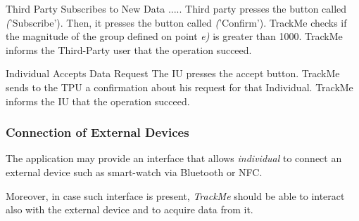 \documentclass[a4paper]{article}
\begin{document}
        \begin{usecase}{Third Party Subscribes to New Data}
              {.....}
              {Third party presses the button called \textit('Subscribe'). Then, it presses the button called \textit('Confirm').}
              {TrackMe checks if the magnitude of the group defined on point \textit{e)} is greater than 1000.}
              {TrackMe informs the Third-Party user that the operation succeed.}
        \end{usecase}
        
        \begin{usecase}{Individual Accepts Data Request}
              {The IU presses the accept button.}
              {TrackMe sends to the TPU a confirmation about his request for that Individual.}
              {TrackMe informs the IU that the operation succeed.}
        \end{usecase}
        
        \subsubsection{Connection of External Devices}
        The application may provide an interface that allows \textit{individual} to connect an external device such as smart-watch via Bluetooth or NFC.
        
        Moreover, in case such interface is present, \textit{TrackMe} should be able to interact also with the external device and to acquire data from it.
        
\end{document}

